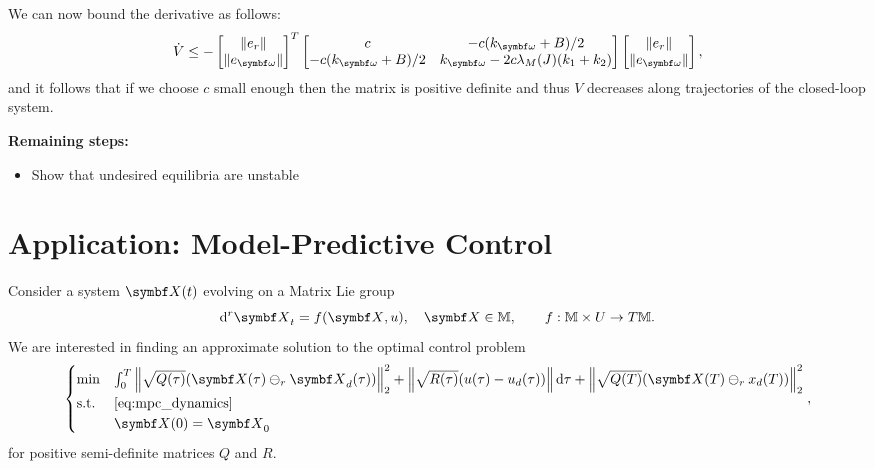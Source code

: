 \begin{tcolorbox}
  We can now bound the derivative as follows:
  \begin{equation}
    \dot V \leq
    - \begin{bmatrix}
      \| e_r \| \\ \| e_\bomega \|
    \end{bmatrix}^T
    \begin{bmatrix}
      c                   & -c(k_\bomega + B)/2                     \\
      -c(k_\bomega + B)/2 & k_\bomega - 2c \lambda_M(J) (k_1 + k_2)
    \end{bmatrix}
    \begin{bmatrix}
      \| e_r \| \\ \| e_\bomega \|
    \end{bmatrix},
  \end{equation}
  and it follows that if we choose $c$ small enough then the matrix is positive definite and thus $V$ decreases along trajectories of the closed-loop system.
\end{tcolorbox}

\textbf{Remaining steps:}

\begin{itemize}
  \item Show that undesired equilibria are unstable
\end{itemize}


\chapter{Application: Model-Predictive Control}

Consider a system $\X(t)$ evolving on a Matrix Lie group
\begin{equation}
  \label{eq:mpc_dynamics}
  \mathrm{d}^r \X_t = f(\X, u), \quad \X \in \M, \qquad f : \M \times U \rightarrow T \M.
\end{equation}
We are interested in finding an approximate solution to the optimal control problem
\begin{equation}
  \label{eq:mpc_ocp}
  \begin{cases}
    \min        & \int_0^T \left\| \sqrt{Q(\tau)} (\X(\tau) \ominus_r \X_d(\tau)) \right\|_2^2 + \left\| \sqrt{R(\tau)} (u(\tau) - u_d(\tau)) \right\| \mathrm{d} \tau + \left\| \sqrt{Q(T)} (\X(T) \ominus_r x_d(T)) \right\|_2^2 \\
    \text{s.t.} & \eqref{eq:mpc_dynamics}                                                                                                                                                                                          \\
                & \X(0) = \X_0
  \end{cases},
\end{equation}
for positive semi-definite matrices $Q$ and $R$.

